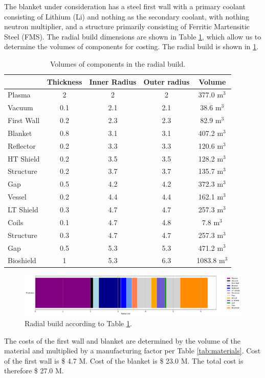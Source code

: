 The blanket under consideration has a steel first wall with a primary coolant consisting of Lithium (Li) and nothing as the secondary coolant, with nothing neutron multiplier, and a structure primarily consisting of Ferritic Martensitic Steel (FMS). The radial build dimensions are shown in Table \ref{tab:volumes}, which allow us to determine the volumes of components for costing.  The radial build is shown in \ref{fig:radial}.  \\


\begin{table}[h!]
    \centering
    \begin{tabular}{l c  c c c}
    \hline
        &	Thickness	&	Inner Radius	&	Outer radius	&	Volume		\\
        \hline
Plasma	&	2	&	2	&	2	&	377.0	m$^{3}$	\\
Vacuum	&	0.1	&	2.1	&	2.1	&	38.6	m$^{3}$	\\
First Wall	&	0.2	&	2.3	&	2.3	&	82.9	m$^{3}$	\\
Blanket	&	0.8	&	3.1	&	3.1	&	407.2	m$^{3}$	\\
Reflector	&	0.2	&	3.3	&	3.3	&	120.6	m$^{3}$	\\
HT Shield	&	0.2	&	3.5	&	3.5	&	128.2	m$^{3}$	\\
Structure	&	0.2	&	3.7	&	3.7	&	135.7	m$^{3}$	\\
Gap	&	0.5	&	4.2	&	4.2	&	372.3	m$^{3}$	\\
Vessel	&	0.2	&	4.4	&	4.4	&	162.1	m$^{3}$	\\
LT Shield	&	0.3	&	4.7	&	4.7	&	257.3	m$^{3}$	\\
Coils	&	0.1	&	4.7	&	4.8	&	7.8	m$^{3}$	\\
Structure	&	0.3	&	4.7	&	4.7	&	257.3	m$^{3}$	\\
Gap	&	0.5	&	5.3	&	5.3	&	471.2	m$^{3}$	\\
Bioshield	&	1	&	5.3	&	6.3	&	1083.8	m$^{3}$	\\

        \hline
    \end{tabular}
    \caption{Volumes of components in the radial build.}
    \label{tab:volumes}
\end{table}

\begin{figure}
    \centering
    \includegraphics[width=0.9\linewidth]{Figures/radial_build.pdf}
    \caption{Radial build according to Table \ref{tab:volumes}.}
    \label{fig:radial}
\end{figure}



The costs of the first wall and blanket are determined by the volume of the material and multiplied by a manufacturing factor per Table \ref{tab:materials}.   Cost of the first wall is \$ 4.7 M.  Cost of the blanket is \$ 23.0 M. The total cost is therefore \$ 27.0 M.

